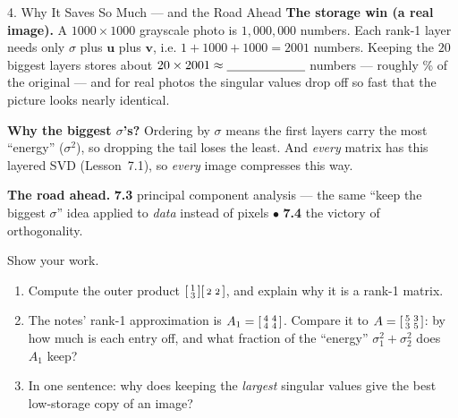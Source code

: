 \documentclass[10pt]{article}
\newcommand{\uu}{\mathbf{u}}
\newcommand{\vv}{\mathbf{v}}
\begin{document}
\begin{notesbox}{4. Why It Saves So Much --- and the Road Ahead}
\textbf{The storage win (a real image).} A $1000\times1000$ grayscale photo is $1{,}000{,}000$ numbers. Each
rank-1 layer needs only $\sigma$ plus $\uu$ plus $\vv$, i.e. $1+1000+1000=2001$ numbers. Keeping the
$20$ biggest layers stores about $20\times2001\approx\blank{2.2cm}$ numbers --- roughly
\blank{1.4cm}\% of the original --- and for real photos the singular values drop off so fast that the
picture looks nearly identical.

\vspace{2pt}
\textbf{Why the biggest $\sigma$'s?} Ordering by $\sigma$ means the first layers carry the most ``energy''
($\sigma^2$), so dropping the tail loses the least. And \emph{every} matrix has this layered SVD
(Lesson~7.1), so \emph{every} image compresses this way.

\vspace{2pt}
\textbf{The road ahead.} \textbf{7.3} principal component analysis --- the same ``keep the biggest
$\sigma$'' idea applied to \emph{data} instead of pixels\; $\bullet$\; \textbf{7.4} the victory of orthogonality.
\end{notesbox}

\begin{practicebox}
Show your work.
\begin{enumerate}[leftmargin=1.6em, itemsep=4pt]
  \item Compute the outer product $\begin{bsmallmatrix} 1\\3 \end{bsmallmatrix}\begin{bsmallmatrix} 2 & 2 \end{bsmallmatrix}$, and explain why it is a rank-1 matrix. \writeline
  \item The notes' rank-1 approximation is $A_1=\begin{bsmallmatrix} 4 & 4\\ 4 & 4 \end{bsmallmatrix}$. Compare it to $A=\begin{bsmallmatrix} 5 & 3\\ 3 & 5 \end{bsmallmatrix}$: by how much is each entry off, and what fraction of the ``energy'' $\sigma_1^2+\sigma_2^2$ does $A_1$ keep? \writeline
  \item In one sentence: why does keeping the \emph{largest} singular values give the best low-storage copy of an image? \writeline
\end{enumerate}
\end{practicebox}
\end{document}
